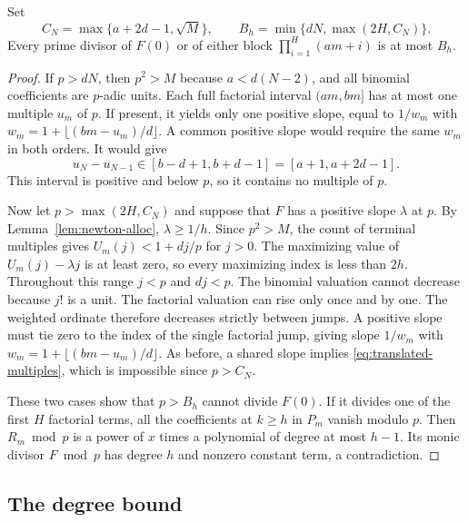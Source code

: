 \begin{lemma}
\label{lem:prime-support}
Set
\[
 C_N=\max\{a+2d-1,\sqrt M\},\qquad B_h=\min\{dN,\max(2H,C_N)\}.
\]
Every prime divisor of \(F(0)\) or of either block
\(\prod_{i=1}^H(am+i)\) is at most \(B_h\).
\end{lemma}
\begin{proof}
If \(p>dN\), then \(p^2>M\) because \(a<d(N-2)\), and all binomial
coefficients are \(p\)-adic units. Each full factorial interval
\((am,bm]\) has at most one multiple \(u_m\) of \(p\). If present,
it yields only one positive slope, equal to \(1/w_m\) with
\(w_m=1+\lfloor(bm-u_m)/d\rfloor\).
A common positive slope would require the same \(w_m\) in both orders.
It would give
\begin{equation}
 u_N-u_{N-1}\in[b-d+1,b+d-1]=[a+1,a+2d-1].
 \label{eq:translated-multiples}
\end{equation}
This interval is positive and below \(p\), so it contains no multiple
of \(p\).

Now let \(p>\max(2H,C_N)\) and suppose that \(F\) has a positive slope
\(\lambda\) at \(p\). By Lemma~\ref{lem:newton-alloc},
\(\lambda\ge1/h\). Since \(p^2>M\), the count of terminal multiples
gives \(U_m(j)<1+dj/p\) for \(j>0\). The maximizing value of
\(U_m(j)-\lambda j\) is at least zero, so every maximizing index is
less than \(2h\). Throughout this range \(j<p\) and \(dj<p\).
The binomial valuation cannot decrease because \(j!\) is a unit.
The factorial valuation can rise only once and by one. The weighted
ordinate therefore decreases strictly between jumps. A positive
slope must tie zero to the index of the single factorial jump, giving
slope \(1/w_m\) with \(w_m=1+\lfloor(bm-u_m)/d\rfloor\).
As before, a shared slope implies \eqref{eq:translated-multiples},
which is impossible since \(p>C_N\).

These two cases show that \(p>B_h\) cannot divide \(F(0)\).
If it divides one of the first \(H\) factorial terms, all the
coefficients at \(k\ge h\) in \(P_m\) vanish modulo \(p\).
Then \(R_m\bmod p\) is a power of \(x\) times a polynomial of degree
at most \(h-1\). Its monic divisor \(F\bmod p\) has degree \(h\)
and nonzero constant term, a contradiction.
\end{proof}

\subsection{The degree bound}

